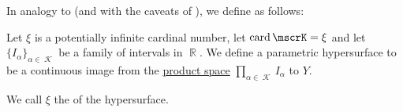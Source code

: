 \begin{definition}\label{def:parametric_hypersurface}
  In analogy to  (and with the caveats of ), we define  as follows:

  Let \( \xi \) is a potentially infinite cardinal number, let \( \card \mscrK = \xi \) and let \( \{ I_\alpha \}_{\alpha \in \mscrK} \) be a family of intervals in \( \BbbR \). We define a parametric hypersurface to be a continuous image from the \hyperref[def:topological_product]{product space} \( \prod_{\alpha \in \mscrK} I_\alpha \) to \( Y \).

  We call \( \xi \) the  of the hypersurface.
\end{definition}
